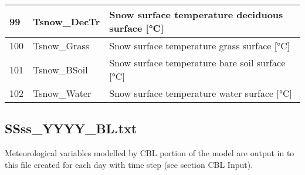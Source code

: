\documentclass[letterpaper,10pt,english]{sphinxmanual}
\begin{document}
\begin{savenotes}
\begin{longtable}{|l|l|l|}
\\
\hline
99
&
Tsnow\_DecTr
&
Snow surface
temperature \textendash{}
deciduous surface
{[}°C{]}
\\
\hline
100
&
Tsnow\_Grass
&
Snow surface
temperature \textendash{} grass
surface {[}°C{]}
\\
\hline
101
&
Tsnow\_BSoil
&
Snow surface
temperature \textendash{} bare
soil surface {[}°C{]}
\\
\hline
102
&
Tsnow\_Water
&
Snow surface
temperature \textendash{} water
surface {[}°C{]}
\\
\hline
\end{longtable}\sphinxatlongtableend\end{savenotes}


\subsection{SSss\_YYYY\_BL.txt}
\label{\detokenize{output-files:ssss-yyyy-bl-txt}}
Meteorological variables modelled by CBL portion of the model are output
in to this file created for each day with time step (see section CBL
Input).
\end{document}
